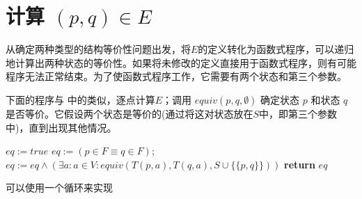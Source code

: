\section{计算 $ (p,q) \in E $}

从确定两种类型的结构等价性问题出发，将$E$的定义转化为函数式程序，可以递归地计算出两种状态的等价性。如果将未修改的定义直接用于函数式程序，则有可能程序无法正常结束。为了使函数式程序工作，它需要有两个状态和第三个参数。

下面的程序与 \cite{t-Ei91} 中的类似，逐点计算$E$；调用 $equiv(p,q,\emptyset)$ 确定状态 $p$ 和状态 $q$ 是否等价。它假设两个状态是等价的(通过将这对状态放在$S$中，即第三个参数中)，直到出现其他情况。

\begin{algorithm}
    \small
    \begin{algorithmic}[1]
                $eq := true$
                \State $ eq := ( p \in F \equiv q \in F ) $;
                \State $ eq := eq \land (\exists a:a \in V : equiv (T(p,a),T(q,a),S \cup \{ \{ p,q\} \}  ) )  $
            \EndIf
            \State \textbf{return} $eq$
        \EndFunction
    \end{algorithmic}
\end{algorithm}


\newpage
可以使用一个循环来实现

